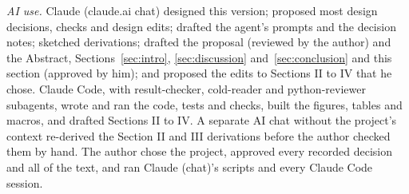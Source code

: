 \documentclass[conference]{IEEEtran}
\begin{document}
\emph{AI use.} Claude (claude.ai chat) designed this version; proposed most design decisions, checks and design edits; drafted the agent's prompts and the decision notes; sketched derivations; drafted the proposal (reviewed by the author) and the Abstract, Sections~\ref{sec:intro}, \ref{sec:discussion} and~\ref{sec:conclusion} and this section (approved by him); and proposed the edits to Sections II to IV that he chose. Claude Code, with result-checker, cold-reader and python-reviewer subagents, wrote and ran the code, tests and checks, built the figures, tables and macros, and drafted Sections II to IV. A separate AI chat without the project's context re-derived the Section II and III derivations before the author checked them by hand. The author chose the project, approved every recorded decision and all of the text, and ran Claude (chat)'s scripts and every Claude Code session.

\label{refs:start}


\end{document}
